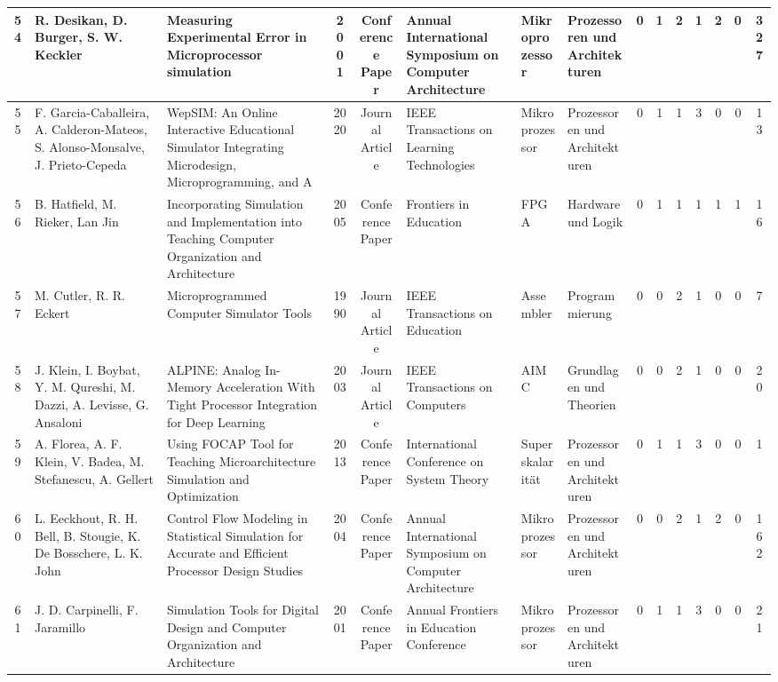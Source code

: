 \begin{landscape}
\begin{longtable}{|c|p{2cm}|p{2cm}|c|c|p{2cm}|p{1cm}|p{1cm}|c|c|c|c|c|c|c|}
    54 & R. Desikan, D. Burger, S. W. Keckler & Measuring Experimental Error in Microprocessor simulation & 2001 & Conference Paper & Annual International Symposium on Computer Architecture & Mikroprozessor & Prozessoren und Architekturen & 0 & 1 & 2 & 1 & 2 & 0 & 327 \\ \hline
    55 & F. Garcia-Caballeira, A. Calderon-Mateos, S. Alonso-Monsalve, J. Prieto-Cepeda & WepSIM: An Online Interactive Educational Simulator Integrating Microdesign, Microprogramming, and A & 2020 & Journal Article & IEEE Transactions on Learning Technologies & Mikroprozessor & Prozessoren und Architekturen & 0 & 1 & 1 & 3 & 0 & 0 & 13 \\ \hline
    56 & B. Hatfield, M. Rieker, Lan Jin & Incorporating Simulation and Implementation into Teaching Computer Organization and Architecture & 2005 & Conference Paper & Frontiers in Education & FPGA & Hardware und Logik & 0 & 1 & 1 & 1 & 1 & 1 & 16 \\ \hline
    57 & M. Cutler, R. R. Eckert & Microprogrammed Computer Simulator Tools & 1990 & Journal Article & IEEE Transactions on Education & Assembler & Programmierung & 0 & 0 & 2 & 1 & 0 & 0 & 7 \\ \hline
    58 & J. Klein, I. Boybat, Y. M. Qureshi, M. Dazzi, A. Levisse, G. Ansaloni & ALPINE: Analog In-Memory Acceleration With Tight Processor Integration for Deep Learning & 2003 & Journal Article & IEEE Transactions on Computers & AIMC & Grundlagen und Theorien & 0 & 0 & 2 & 1 & 0 & 0 & 20 \\ \hline
    59 & A. Florea, A. F. Klein, V. Badea, M. Stefanescu, A. Gellert & Using FOCAP Tool for Teaching Microarchitecture Simulation and Optimization & 2013 & Conference Paper & International Conference on System Theory & Superskalarität & Prozessoren und Architekturen & 0 & 1 & 1 & 3 & 0 & 0 & 1 \\ \hline
    60 & L. Eeckhout, R. H. Bell, B. Stougie, K. De Bosschere, L. K. John & Control Flow Modeling in Statistical Simulation for Accurate and Efficient Processor Design Studies & 2004 & Conference Paper & Annual International Symposium on Computer Architecture & Mikroprozessor & Prozessoren und Architekturen & 0 & 0 & 2 & 1 & 2 & 0 & 162 \\ \hline
    61 & J. D. Carpinelli, F. Jaramillo & Simulation Tools for Digital Design and Computer Organization and Architecture & 2001 & Conference Paper & Annual Frontiers in Education Conference & Mikroprozessor & Prozessoren und Architekturen & 0 & 1 & 1 & 3 & 0 & 0 & 21 \\ \hline

\end{longtable}
\end{landscape}
